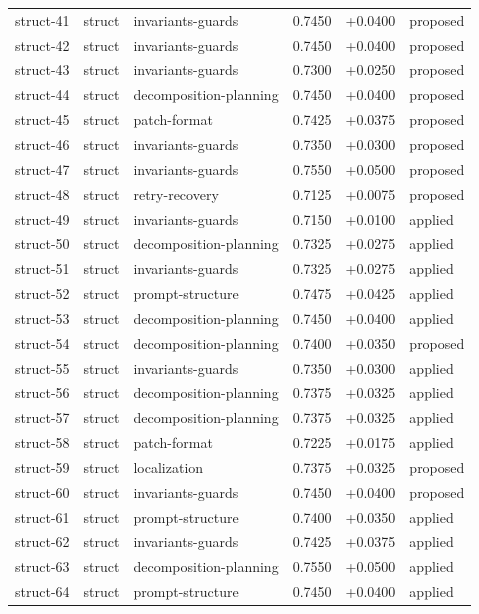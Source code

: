 \begin{center}
\begin{longtable}{llp{5.2cm}rrl}
struct-41 & struct & invariants-guards & 0.7450 & +0.0400 & proposed \\
struct-42 & struct & invariants-guards & 0.7450 & +0.0400 & proposed \\
struct-43 & struct & invariants-guards & 0.7300 & +0.0250 & proposed \\
struct-44 & struct & decomposition-planning & 0.7450 & +0.0400 & proposed \\
struct-45 & struct & patch-format & 0.7425 & +0.0375 & proposed \\
struct-46 & struct & invariants-guards & 0.7350 & +0.0300 & proposed \\
struct-47 & struct & invariants-guards & 0.7550 & +0.0500 & proposed \\
struct-48 & struct & retry-recovery & 0.7125 & +0.0075 & proposed \\
struct-49 & struct & invariants-guards & 0.7150 & +0.0100 & applied \\
struct-50 & struct & decomposition-planning & 0.7325 & +0.0275 & applied \\
struct-51 & struct & invariants-guards & 0.7325 & +0.0275 & applied \\
struct-52 & struct & prompt-structure & 0.7475 & +0.0425 & applied \\
struct-53 & struct & decomposition-planning & 0.7450 & +0.0400 & applied \\
struct-54 & struct & decomposition-planning & 0.7400 & +0.0350 & proposed \\
struct-55 & struct & invariants-guards & 0.7350 & +0.0300 & applied \\
struct-56 & struct & decomposition-planning & 0.7375 & +0.0325 & applied \\
struct-57 & struct & decomposition-planning & 0.7375 & +0.0325 & applied \\
struct-58 & struct & patch-format & 0.7225 & +0.0175 & applied \\
struct-59 & struct & localization & 0.7375 & +0.0325 & proposed \\
struct-60 & struct & invariants-guards & 0.7450 & +0.0400 & proposed \\
struct-61 & struct & prompt-structure & 0.7400 & +0.0350 & applied \\
struct-62 & struct & invariants-guards & 0.7425 & +0.0375 & applied \\
struct-63 & struct & decomposition-planning & 0.7550 & +0.0500 & applied \\
struct-64 & struct & prompt-structure & 0.7450 & +0.0400 & applied \\

\end{longtable}
\end{center}
